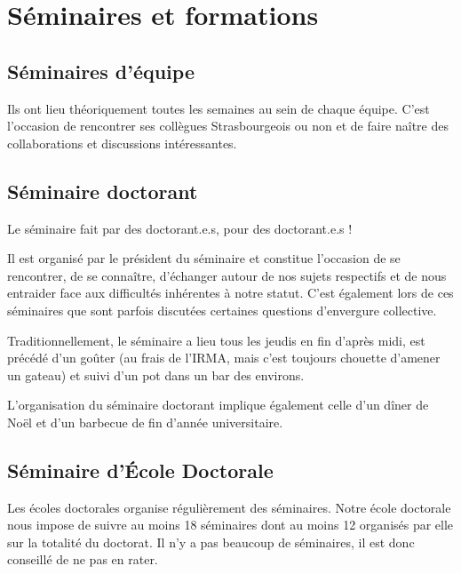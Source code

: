\documentclass[a5paper]{article}
\begin{document}
\section{Séminaires et formations}
\label{sec:seminaires-et}

\subsection{Séminaires d'équipe}
\label{subsec:seminaires-dequipe}

Ils ont lieu théoriquement toutes les semaines au sein de chaque équipe. C'est l'occasion de rencontrer ses collègues Strasbourgeois ou non et de faire naître des collaborations et discussions intéressantes.

\subsection{Séminaire doctorant}
\label{subsec:seminaire-doctorant}

Le séminaire fait par des doctorant.e.s, pour des doctorant.e.s !

\vspace{1em}

Il est organisé par le président du séminaire et constitue l'occasion de se rencontrer, de se connaître, d'échanger autour de nos sujets respectifs et de nous entraider face aux difficultés inhérentes à notre statut. C'est également lors de ces séminaires que sont parfois discutées certaines questions d'envergure collective.

Traditionnellement, le séminaire a lieu tous les jeudis en fin d'après midi, est précédé d'un goûter (au frais de l'IRMA, mais c'est toujours chouette d'amener un gateau) et suivi d'un pot dans un bar des environs.

\vspace{1em}

L'organisation du séminaire doctorant implique également celle d'un dîner de Noël et d'un barbecue de fin d'année universitaire.

\subsection{Séminaire d'École Doctorale}
\label{subsec:semin-decole-doct}

Les écoles doctorales organise régulièrement des séminaires. Notre école doctorale nous impose de suivre au moins 18 séminaires dont au moins 12 organisés par elle sur la totalité du doctorat. Il n'y a pas beaucoup de séminaires, il est donc conseillé de ne pas en rater.
\end{document}
